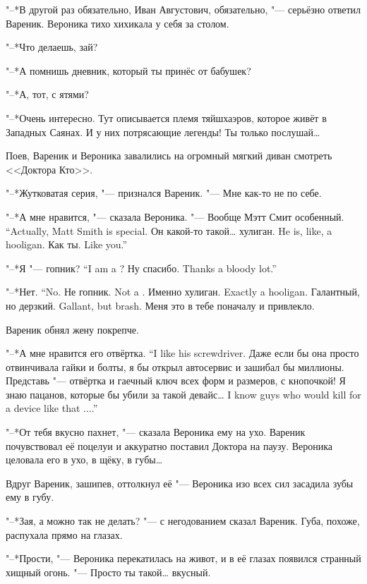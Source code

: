 "--*В другой раз обязательно, Иван Августович, обязательно, "--- серьёзно ответил Вареник.
Вероника тихо хихикала у себя за столом.

"--*Что делаешь, зай?

"--*А помнишь дневник, который ты принёс от бабушек?

"--*А, тот, с ятями?

"--*Очень интересно.
Тут описывается племя тяйшхаэров, которое живёт в Западных Саянах.
И у них потрясающие легенды!
Ты только послушай\dots{}

Поев, Вареник и Вероника завалились на огромный мягкий диван смотреть <<Доктора Кто>>.

"--*Жутковатая серия, "--- признался Вареник.
"--- Мне как-то не по себе.

"--*А мне нравится, "--- сказала Вероника.
{"--- Вообще Мэтт Смит особенный.}
{``Actually, Matt Smith is special.}
{Он какой-то такой\dots{} хулиган.}
{He is, like, a hooligan.}
{Как ты.}
{Like you.''}

{"--*Я "--- гопник?}
{``I am a \gopnik?}
{Ну спасибо.}
{Thanks a bloody lot.''}

{"--*Нет.}
{``No.}
{Не гопник.}
{Not a \gopnik.}
{Именно хулиган.}
{Exactly a hooligan.}
{Галантный, но дерзкий.}
{Gallant, but brash.}
Меня это в тебе поначалу и привлекло.

Вареник обнял жену покрепче.

{"--*А мне нравится его отвёртка.}
{``I like his screwdriver.}
Даже если бы она просто отвинчивала гайки и болты, я бы открыл автосервис и зашибал бы миллионы.
Представь "--- отвёртка и гаечный ключ всех форм и размеров, с кнопочкой!
{Я знаю пацанов, которые бы убили за такой девайс\dots}
{I know guys who would kill for a device like that ....''}

"--*От тебя вкусно пахнет, "--- сказала Вероника ему на ухо.
Вареник почувствовал её поцелуи и аккуратно поставил Доктора на паузу.
Вероника целовала его в ухо, в щёку, в губы\dots{}

Вдруг Вареник, зашипев, оттолкнул её "--- Вероника изо всех сил засадила зубы ему в губу.

"--*Зая, а можно так не делать? "--- с негодованием сказал Вареник.
Губа, похоже, распухала прямо на глазах.

"--*Прости, "--- Вероника перекатилась на живот, и в её глазах появился странный хищный огонь.
"--- Просто ты такой\dots{} вкусный.

